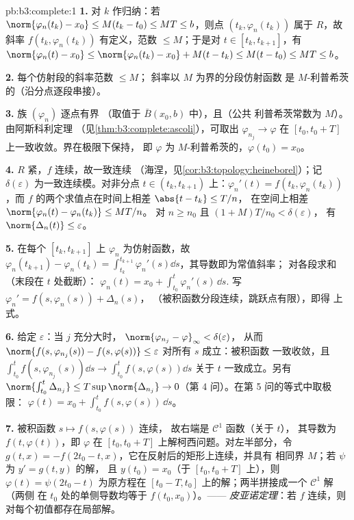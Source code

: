 \begin{solution}{pb:b3:complete:1}
\textbf{1.} 对 $k$ 作归纳：若 $\norm{\varphi_n(t_k) - x_0}
\leq M(t_k - t_0) \leq MT \leq b$，则点 $(t_k,
\varphi_n(t_k))$ 属于 $R$，故斜率 $f(t_k,
\varphi_n(t_k))$ 有定义，范数 $\leq M$；于是对 $t \in
[t_k, t_{k+1}]$，有 $\norm{\varphi_n(t) - x_0} \leq
\norm{\varphi_n(t_k) - x_0} + M(t - t_k) \leq M(t - t_0) \leq
MT \leq b$。

\textbf{2.} 每个仿射段的斜率范数 $\leq M$；
斜率以 $M$ 为界的分段仿射函数
是 $M$-利普希茨的（沿分点逐段串接）。

\textbf{3.} 族 $(\varphi_n)$ 逐点有界
（取值于 $\bar B(x_0, b)$ 中），且（公共
利普希茨常数为 $M$）。由阿斯科利定理
（见\cref{thm:b3:complete:ascoli}），可取出 $\varphi_{n_j} \to
\varphi$ 在 $[t_0, t_0 + T]$ 上一致收敛。界在极限下保持，
即 $\varphi$ 为 $M$-利普希茨的，$\varphi(t_0) = x_0$。

\textbf{4.} $R$ 紧，$f$ 连续，故一致连续
（海涅，见\cref{cor:b3:topology:heineborel}）；记
$\delta(\varepsilon)$ 为一致连续模。对非分点 $t \in (t_k,
t_{k+1})$ 上：$\varphi_n'(t) = f(t_k, \varphi_n(t_k))$，而
$f$ 的两个求值点在时间上相差 $\abs{t - t_k} \leq T/n$，
在空间上相差 $\norm{\varphi_n(t) - \varphi_n(t_k)} \leq MT/n$。
对 $n \geq n_0$ 且 $(1 + M)T/n_0 < \delta(\varepsilon)$，
有 $\norm{\Delta_n(t)} \leq \varepsilon$。

\textbf{5.} 在每个 $[t_k, t_{k+1}]$ 上 $\varphi_n$ 为仿射函数，故
$\varphi_n(t_{k+1}) - \varphi_n(t_k) = \int_{t_k}^{t_{k+1}}
\varphi_n'(s)\dd s$，其导数即为常值斜率；
对各段求和（末段在 $t$ 处截断）：
$\varphi_n(t) = x_0 + \int_{t_0}^t\varphi_n'(s)\,\dd s$.
写 $\varphi_n' = f(s, \varphi_n(s)) + \Delta_n(s)$，
（被积函数分段连续，跳跃点有限），即得
上式。

\textbf{6.} 给定 $\varepsilon$：当 $j$ 充分大时，
$\norm{\varphi_{n_j} - \varphi}_\infty < \delta(\varepsilon)$，
从而 $\norm{f(s, \varphi_{n_j}(s)) - f(s, \varphi(s))} \leq
\varepsilon$ 对所有 $s$ 成立：被积函数
一致收敛，且 $\int_{t_0}^t f(s,\varphi_{n_j}(s))\dd s \to
\int_{t_0}^tf(s, \varphi(s))\dd s$ 关于 $t$ 一致成立。另有
$\norm{\int_{t_0}^t\Delta_{n_j}} \leq T\sup\norm{\Delta_{n_j}}
\to 0$（第 4 问）。在第 5 问的等式中取极限：
$\varphi(t) = x_0 + \int_{t_0}^tf(s,
\varphi(s))\,\dd s$。

\textbf{7.} 被积函数 $s \mapsto f(s, \varphi(s))$ 连续，
故右端是 $\mathcal C^1$ 函数（关于 $t$），
其导数为 $f(t, \varphi(t))$，即 $\varphi$ 在
$[t_0, t_0 + T]$ 上解柯西问题。对左半部分，令 $g(t, x) =
-f(2t_0 - t, x)$，它在反射后的矩形上连续，并具有
相同界 $M$；若 $\psi$ 为 $y' = g(t,y)$ 的解，
且 $y(t_0) = x_0$（于 $[t_0, t_0 + T]$ 上），则 $\varphi(t) =
\psi(2t_0 - t)$ 为原方程在 $[t_0 - T,
t_0]$ 上的解；两半拼接成一个 $\mathcal C^1$ 解（两侧
在 $t_0$ 处的单侧导数均等于 $f(t_0, x_0)$）。——
\emph{皮亚诺定理}：若 $f$ 连续，则
对每个初值都存在局部解。


\end{solution}
